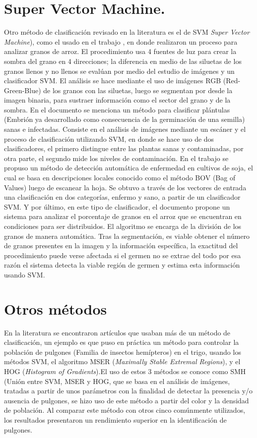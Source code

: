 \section{Super Vector Machine.}
	Otro método de clasificación revisado en la literatura es el de SVM \textit{Super Vector Machine}), como el usado en el trabajo \cite{LIU201679}, en donde realizaron un proceso para analizar granos de arroz. El procedimiento usa 4 fuentes de luz para crear la sombra del grano en 4 direcciones; la diferencia en medio de las siluetas de los granos llenos y no llenos se evalúan por medio del estudio de imágenes y un clasificador SVM. El análisis se hace mediante el uso de imágenes RGB (Red-Green-Blue) de los granos con las siluetas, luego se segmentan por  desde la imagen binaria, para sustraer información como el sector del grano y de la sombra. En el documento \cite{CHUNG2016404} se menciona un método para clasificar plántulas (Embrión ya desarrollado como consecuencia de la germinación de una semilla) sanas e infectadas. Consiste en el análisis de imágenes mediante un escáner y el proceso de clasificación utilizando SVM, en donde se hace uso de dos clasificadores, el primero distingue entre las plantas sanas y contaminadas, por otra parte, el segundo mide los niveles de contaminación. En el trabajo \cite{PIRES201648} se propuso un método de detección automática de enfermedad en cultivos de soja, el cual se basa en descripciones locales conocido como el método BOV (Bag of Values) luego de escanear la hoja. Se obtuvo a través de los vectores de entrada una clasificación en dos categorías, enfermo y sano, a partir de un clasificador SVM. Y por último, en este tipo de clasificador, el documento \cite{SUN2014426} propone un sistema para analizar el porcentaje de granos en el arroz que se encuentran en condiciones para ser distribuidos. El algoritmo se encarga de la división de los granos de manera automática. Tras la segmentación, es viable obtener el número de granos presentes en la imagen y la información específica, la exactitud del procedimiento puede verse afectada si el germen no se extrae del todo por esa razón el sistema detecta la viable región de germen y estima esta información usando SVM.\\

\section{Otros métodos}
	En la literatura se encontraron artículos que usaban más de un método de clasificación, un ejemplo es \cite{LIU201682} que puso en práctica un método para controlar la población de pulgones (Familia de insectos hemípteros) en el trigo, usando los métodos SVM, el algoritmo MSER (\textit{Maximally Stable Extremal Regions}), y el HOG (\textit{Histogram of Gradients}).El uso de estos 3 métodos se conoce como SMH (Unión entre SVM, MSER y HOG, que se basa en el análisis de imágenes, tratadas a partir de unos parámetros con la finalidad de detectar la presencia y/o ausencia de pulgones, se hizo uso de este método a partir del color y la densidad de población. Al comparar este método con otros cinco comúnmente utilizados, los resultados presentaron un rendimiento superior en la identificación de pulgones. \\
	
